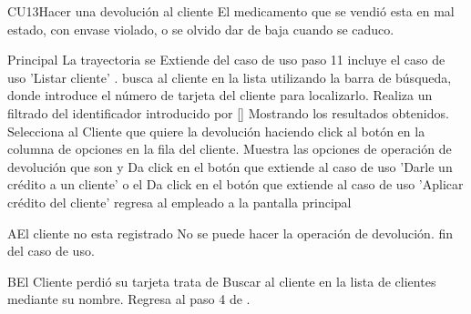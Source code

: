 \begin{UseCase}{CU13}{Hacer una devolución al cliente}{
	El medicamento que se vendió esta en mal estado, con envase violado, o se olvido dar de baja cuando se caduco.
	}
	\end{UseCase}
	\begin{UCtrayectoria}{Principal}
		\UCpaso La trayectoria se Extiende del caso de uso  paso 11
		\UCpaso incluye el caso de uso 'Listar cliente' .
		\UCpaso [\UCactor] busca al cliente en la lista utilizando la barra de búsqueda, donde introduce el número de tarjeta del cliente para localizarlo.	
		\UCpaso Realiza un filtrado del identificador introducido por [\UCactor] Mostrando los resultados obtenidos.
		\UCpaso[\UCactor] Selecciona al Cliente que quiere la devolución haciendo click al botón  en la columna de opciones en la fila del cliente.
		\UCpaso Muestra las opciones de operación de devolución que son  y 
		\UCpaso [\UCactor] Da click en el botón  que extiende al caso de uso 'Darle un crédito a un cliente'
		o el \UCactor Da click en el botón  que extiende al caso de uso 'Aplicar crédito del cliente' 
		\UCpaso regresa al empleado a la pantalla principal 
		
	\end{UCtrayectoria}

\begin{UCtrayectoriaA}{A}{El cliente no esta registrado}
			\UCpaso No se puede hacer la operación de devolución.
			\UCpaso fin del caso de uso.
		\end{UCtrayectoriaA}	
\begin{UCtrayectoriaA}{B}{El Cliente perdió su tarjeta}
			\UCpaso [\UCactor] trata de Buscar al cliente en la lista de clientes mediante su nombre.
			\UCpaso Regresa al paso 4 de .
		\end{UCtrayectoriaA}				


